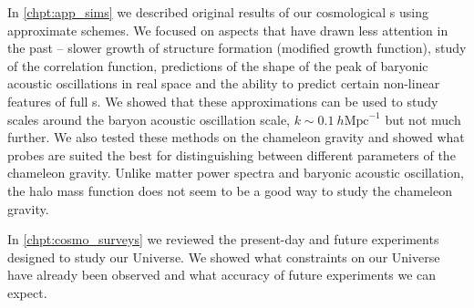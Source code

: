 In \autoref{chpt:app_sims} we described original results of our cosmological \nbodysim s using approximate schemes. We focused on aspects that have drawn less attention in the past -- slower growth of structure formation (modified growth function), study of the correlation function, predictions of the shape of the peak of baryonic acoustic oscillations in real space and the ability to predict certain non-linear features of full \nbody s. We showed that these approximations can be used to study scales around the baryon acoustic oscillation scale, $k\sim 0.1~h\text{Mpc}^{-1}$ but not much further. We also tested these methods on the chameleon gravity and showed what probes are suited the best for distinguishing between different parameters of the chameleon gravity. Unlike matter power spectra and baryonic acoustic oscillation, the halo mass function does not seem to be a good way to study the chameleon gravity.

In \autoref{chpt:cosmo_surveys} we reviewed the present-day and future experiments designed to study our Universe. We showed what constraints on our Universe have already been observed and what accuracy of future experiments we can expect.

